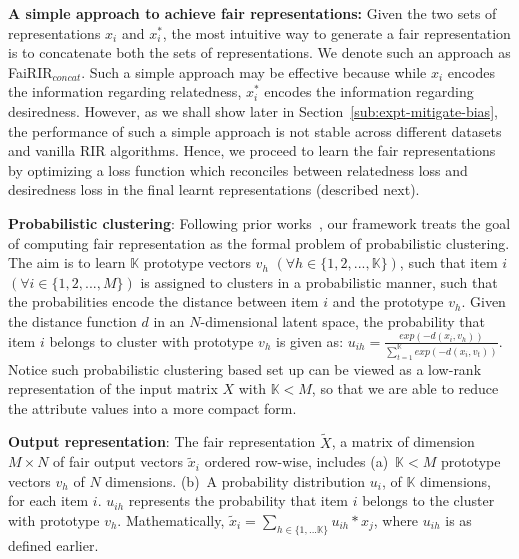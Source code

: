 \vspace{1 mm}
\noindent
\textbf{A simple approach to achieve fair representations:}
Given the two sets of representations $x_i$ and $x^*_i$, the most intuitive way to generate a fair representation is to concatenate both the sets of representations. We denote such an approach as FaiRIR$_{concat}$. 
Such a simple approach may be effective because while $x_i$ encodes the information regarding relatedness, $x^*_i$ encodes the information regarding desiredness. 
However, as we shall show later in Section~\ref{sub:expt-mitigate-bias}, the performance of such a simple approach is not stable across different datasets and vanilla RIR algorithms. Hence, we proceed to learn the fair representations by optimizing a loss function which reconciles between relatedness loss and desiredness loss in the final learnt representations (described next). 



\vspace{1 mm}
\noindent
\textbf{Probabilistic clustering}: Following prior works~\cite{zemel2013learning, lahoti2019ifair}, our framework treats the goal of computing fair representation as the formal problem of probabilistic clustering. The aim is to learn $\mathbb{K}$ prototype vectors $v_h$ $ (\forall h \in \{1, 2, ..., \mathbb{K}\})$, such that item $i$ $(\forall i \in \{1, 2, ..., M\})$ is 
assigned to clusters in a probabilistic manner, such that the probabilities encode the distance between item $i$ and the prototype $v_h$. 
Given the distance function $d$ in an $N$-dimensional latent space, the probability that item $i$ belongs to cluster with prototype $v_h$ is given as: 
$
\label{eqn: softmax}
u_{i h} = \frac{exp(-d(x_i, v_h))}{\sum_{t=1}^{\mathbb{K}}exp(-d(x_i, v_t))}
$.
Notice such probabilistic clustering based set up can be viewed as a low-rank representation of the input matrix $X$ with $\mathbb{K} < M$, so that we are able to reduce the attribute values into a more compact form. 

\noindent
\textbf{Output representation}: The fair representation $\tilde{X}$, a matrix of dimension  $M \times N$ of fair output vectors $\tilde{x}_i$ ordered row-wise, includes
(a)~$\mathbb{K}<M$ prototype vectors $v_h$ of $N$ dimensions.
(b)~A probability distribution $u_i$, of $\mathbb{K}$ dimensions, for each item $i$. $u_{ih}$ represents the probability that item $i$ belongs to the cluster with %
prototype $v_h$. Mathematically,
$
\tilde{x}_i = \sum_{h \in \{1,...\mathbb{K}\}}{u_{ih}*x_{j}}
$, 
where $u_{ih}$ is as defined earlier. 

